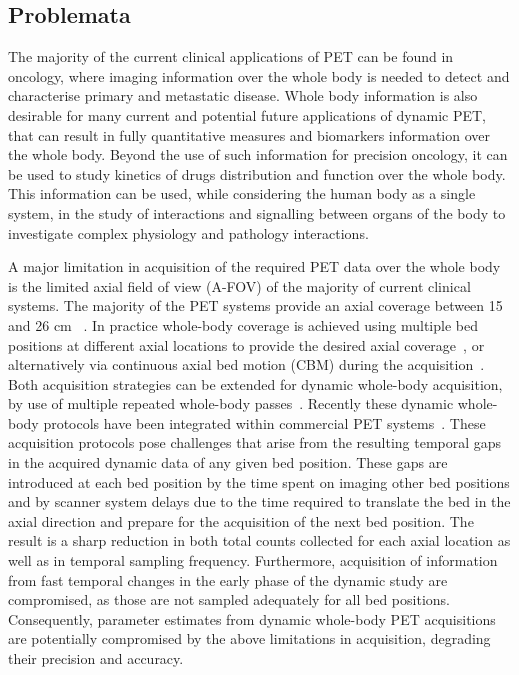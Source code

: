 \subsection*{Problemata}
The majority of the current clinical applications of PET can be found in oncology, where imaging information over the whole body is needed to detect and characterise primary and metastatic disease. 
Whole body information is also desirable for many current and potential future applications of dynamic PET, that can result in fully quantitative measures and biomarkers information over the whole body. Beyond the use of such information for precision oncology, it can be used to study kinetics of drugs distribution and function over the whole body.
This information can be used, while considering the human body as a single system, in the study of interactions and signalling between organs of the body to investigate complex physiology and pathology interactions.

A major limitation in acquisition of the required PET data over the whole body is the limited axial field of view (A-FOV) of the majority of current clinical systems. The majority of the PET systems provide an axial coverage between 15 and 26 cm ~\cite{Vandenberghe2020}. 
In practice whole-body coverage is achieved using multiple bed positions at different axial locations to provide the desired axial coverage~\cite{Schubert1996}, or alternatively via continuous axial bed motion (CBM) during the acquisition~\cite{Panin2014}. 
Both acquisition strategies can be extended for dynamic whole-body acquisition, by use of multiple repeated whole-body passes~\cite {Karakatsanis2011,Karakatsanis2013,Rahmim2019}.
Recently these dynamic whole-body protocols have been integrated within commercial PET systems~\cite{Hu2020}. 
These acquisition protocols pose challenges that arise from the resulting temporal gaps in the acquired dynamic data of any given bed position. These gaps are introduced at each bed position by the time spent on imaging other bed positions and by scanner system delays due to the time required to translate the bed in the axial direction and prepare for the acquisition of the next bed position. The result is a sharp reduction in both total counts collected for each axial location as well as in temporal sampling frequency. Furthermore, acquisition of information from fast temporal changes in the early phase of the dynamic study are compromised, as those are not sampled adequately for all bed positions. Consequently, parameter estimates from dynamic whole-body PET acquisitions are potentially compromised by the above limitations in acquisition, degrading their precision and accuracy.

